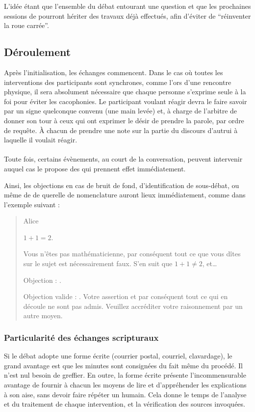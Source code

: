 L’idée étant que l’ensemble du débat entourant une question et que les prochaines sessions de \mainabbr{} pourront hériter des travaux déjà effectués, afin d’éviter de \enquote{réinventer la roue carrée}.
\subsection{Déroulement}
Après l’initialisation, les échanges commencent. Dans le cas où toutes les interventions des participants sont synchrones, comme l’ors d’une rencontre physique, il sera absolument nécessaire que chaque personne s’exprime seule à la foi pour éviter les cacophonies. Le participant voulant réagir devra le faire savoir par un signe quelconque convenu (une main levée) et, à charge de l’arbitre de donner son tour à ceux qui ont exprimer le désir de prendre la parole, par ordre de requête. À chacun de prendre une note sur la partie du discours d’autrui à laquelle il voulait réagir.

\paragraph{}
Toute fois, certains évènements, au court de la conversation, peuvent intervenir auquel cas le \mainabbr{} propose des  qui prennent effet immédiatement.

Ainsi, les objections en cas de bruit de fond, d’identification de sous-débat, ou même de de querelle de nomenclature auront lieux immédiatement, comme dans l’exemple suivant :
\begin{quote}
  \begin{drama}{0cm}{0cm}{Alice}

    \Aspeaks       $1+1=2$.

    \Bspeaks       Vous n’êtes pas mathématicienne, par conséquent tout ce que vous dîtes sur le sujet est nécessairement faux. S’en suit que $1+1\neq2$, et…

    \Aspeaks       Objection : .

    \Arbitrespeaks Objection valide : \B. Votre assertion et par conséquent tout ce qui en découle ne sont pas admis. Veuillez accréditer votre raisonnement par un autre moyen.

  \end{drama}
\end{quote}

\subsubsection{Particularité des échanges scripturaux}
Si le débat adopte une forme écrite (courrier postal, courriel, clavardage), le grand avantage est que les minutes sont consignées du fait même du procédé. Il n’est nul besoin de greffier. En outre, la forme écrite présente l’incommensurable avantage de fournir à chacun les moyens de lire et d’appréhender les explications à son aise, sans devoir faire répéter un humain. Cela donne le temps de l’analyse et du traitement de chaque intervention, et la vérification des sources invoquées.

